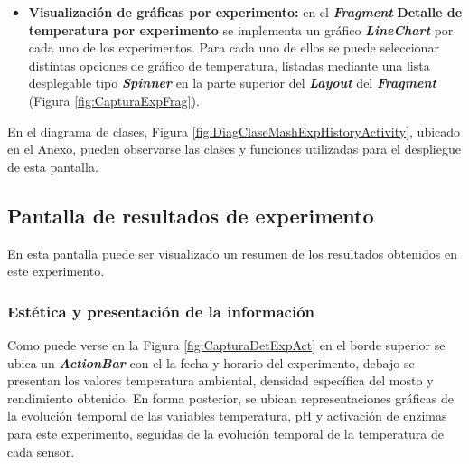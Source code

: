 \begin{itemize}
                 \item \textbf{Visualización de gráficas por experimento:} en el \textbf{\textit{\gls{Fragment}}} \textbf{Detalle de temperatura por experimento} se implementa un gráfico \textbf{\textit{\gls{LineChart}}} por cada uno de los experimentos. Para cada uno de ellos se puede seleccionar distintas opciones de gráfico de temperatura, listadas mediante una lista desplegable tipo \textbf{\textit{\gls{Spinner}}} en la parte superior del \textbf{\textit{\gls{Layout}}} del \textbf{\textit{\gls{Fragment}}} (Figura \ref{fig:CapturaExpFrag}).
             \end{itemize}
             
            \par En el diagrama de clases, Figura \ref{fig:DiagClaseMashExpHistoryActivity}, ubicado en el Anexo, pueden observarse las clases y funciones utilizadas para el despliegue de esta pantalla.
            
        
        \subsection{Pantalla de resultados de experimento}
        \label{DescripPantallaResultadosExperimento}
            \par En esta pantalla puede ser visualizado un resumen de los resultados obtenidos en este experimento.
        
            \subsubsection{Estética y presentación de la información}
            \par Como puede verse en la Figura \ref{fig:CapturaDetExpAct} en el borde superior se ubica un \textbf{\textit{\gls{ActionBar}}} con el la fecha y horario del experimento, debajo se presentan los valores temperatura ambiental, densidad específica del mosto y rendimiento obtenido. En forma posterior, se ubican representaciones gráficas de la evolución temporal de las variables temperatura, pH y activación de enzimas para este experimento, seguidas de la evolución temporal de la temperatura de cada sensor.
            
